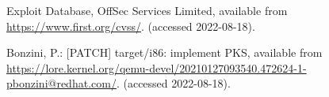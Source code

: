 \documentclass[paper]{ieice}
\begin{document}
\begin{thebibliography}{99}



Exploit Database, OffSec Services Limited,
available from
\url{https://www.first.org/cvss/}.   (accessed 2022-08-18).

  
    Bonzini, P.: [PATCH] target/i86: implement PKS, available from \url{https://lore.kernel.org/qemu-devel/20210127093540.472624-1-pbonzini@redhat.com/}. (accessed 2022-08-18).


\end{thebibliography}
\end{document}
